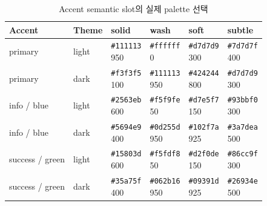 \documentclass[11pt,titlepage]{article}
\begin{document}
\begin{table}[htbp]
\centering
\caption{Accent semantic slot의 실제 palette 선택}
\label{tab:accent-semantic-values}
\scriptsize
\begin{tabularx}{\textwidth}{@{}l l *{4}{>{\centering\arraybackslash}X}@{}}
\toprule
Accent & Theme & solid & wash & soft & subtle \\
\midrule
primary & light & \shortstack{\texttt{\#111113}\\950} & \shortstack{\texttt{\#ffffff}\\0} & \shortstack{\texttt{\#d7d7d9}\\300} & \shortstack{\texttt{\#7d7d7f}\\400} \\
primary & dark & \shortstack{\texttt{\#f3f3f5}\\100} & \shortstack{\texttt{\#111113}\\950} & \shortstack{\texttt{\#424244}\\800} & \shortstack{\texttt{\#d7d7d9}\\300} \\
info / blue & light & \shortstack{\texttt{\#2563eb}\\600} & \shortstack{\texttt{\#f5f9fe}\\50} & \shortstack{\texttt{\#d7e5f7}\\150} & \shortstack{\texttt{\#93bbf0}\\300} \\
info / blue & dark & \shortstack{\texttt{\#5694e9}\\400} & \shortstack{\texttt{\#0d255d}\\950} & \shortstack{\texttt{\#102f7a}\\925} & \shortstack{\texttt{\#3a7dea}\\500} \\
success / green & light & \shortstack{\texttt{\#15803d}\\600} & \shortstack{\texttt{\#f5fdf8}\\50} & \shortstack{\texttt{\#d2f0de}\\150} & \shortstack{\texttt{\#86cc9f}\\300} \\
success / green & dark & \shortstack{\texttt{\#35a75f}\\400} & \shortstack{\texttt{\#062b16}\\950} & \shortstack{\texttt{\#09391d}\\925} & \shortstack{\texttt{\#26934e}\\500} \\

\end{tabularx}
\end{table}
\end{document}
